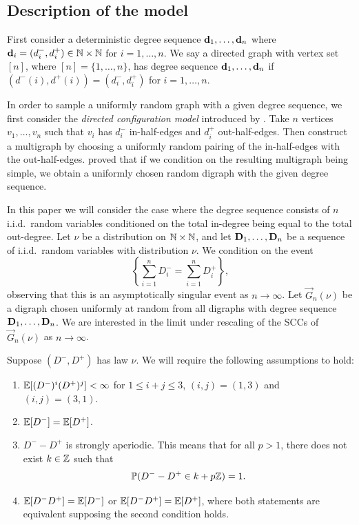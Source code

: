\subsection{Description of the model}

\label{subsec:model-description}

First consider a deterministic degree sequence ${\mathbf d}_1, \ldots, {\mathbf d}_n$ where ${\mathbf d}_i = (d_i^-, d_i^+)\in {\mathbb N} \times {\mathbb N}$ for $i = 1, \ldots, n$. We say a directed graph with vertex set $[n]$, where $[n] = \{1,\dots,n\}$, has degree sequence ${\mathbf d}_1, \ldots, {\mathbf d}_n$ if $(d^-(i), d^+(i)) = (d_i^-, d_i^+)$ for $i = 1, \ldots, n$.

In order to sample a uniformly random graph with a given degree sequence, we first consider the \emph{directed configuration model} introduced by \citet{cooperSizeLargestStrongly2004}. Take $n$ vertices $v_1, \ldots, v_n$ such that $v_i$ has $d^-_i$ in-half-edges and $d^+_i$ out-half-edges. Then construct a multigraph by choosing a uniformly random pairing of the in-half-edges with the out-half-edges. \citet[Sec.\ 2.1]{cooperSizeLargestStrongly2004} proved that if we condition on the resulting multigraph being simple, we obtain a uniformly chosen random digraph with the given degree sequence.

In this paper we will consider the case where the degree sequence  consists of $n$ i.i.d.\ random variables conditioned on the total in-degree being equal to the total out-degree. Let $\nu$ be a distribution on ${\mathbb N} \times {\mathbb N}$, and let ${\mathbf D}_1, \ldots, {\mathbf D}_n$ be a sequence of i.i.d.\ random variables with distribution $\nu$. We condition on the event
\begin{equation*}
    \left\{ \textstyle \sum_{i=1}^n D_i^- = \sum_{i=1}^n D_i^+ \right\},
\end{equation*}
observing that this is an asymptotically singular event as $n\to\infty$. Let $\vec{G}_n(\nu)$ be a digraph chosen uniformly at random from all digraphs with degree sequence ${\mathbf D}_1, \ldots, {\mathbf D}_n$. We are interested in the limit under rescaling of the SCCs of $\vec{G}_n(\nu)$ as $n\to \infty$.

Suppose $(D^-, D^+)$ has law $\nu$. We will require the following assumptions to hold:
\begin{enumerate}
    \item ${\mathbb E}[(D^-)^i(D^+)^j]< \infty$ for $1 \leq i+j\leq 3$, $(i, j) = (1, 3)$ and $(i, j) = (3, 1)$.
    \item ${\mathbb E}[D^-] = {\mathbb E}[D^+]$.
    \item $D^- - D^+$ is strongly aperiodic. This means that for all $p > 1$, there does not exist $k \in {\mathbb Z}$ such that 
    \begin{equation*}
        {\mathbb P}(D^- - D^+ \in k + p{\mathbb Z}) = 1.
    \end{equation*}
    \item ${\mathbb E}[D^-D^+] = {\mathbb E}[D^-]$ or ${\mathbb E}[D^- D^+] = {\mathbb E}[D^+]$, where both statements are equivalent supposing the second condition holds.
\end{enumerate}


